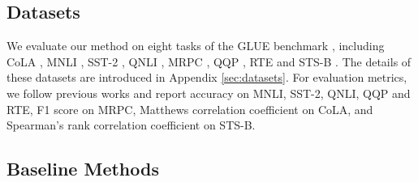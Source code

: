 \documentclass[11pt]{article}
\begin{document}
\subsection{Datasets}
We evaluate our method on eight tasks of the GLUE benchmark \citep{wang-etal-2018-glue}, including CoLA \citep{warstadt-etal-2019-neural}, MNLI \citep{williams-etal-2018-broad}, SST-2 \citep{socher-etal-2013-recursive}, QNLI \citep{rajpurkar-etal-2016-squad}, MRPC \citep{dolan-brockett-2005-automatically}, QQP \citep{chen2018quora}, RTE \citep{bentivogli2009fifth} and STS-B \citep{cer-etal-2017-semeval}. The details of these datasets are introduced in Appendix \ref{sec:datasets}. For evaluation metrics, we follow previous works \citep{park-etal-2021-distilling,liu-etal-2022-multi-granularity} and report accuracy on MNLI, SST-2, QNLI, QQP and RTE, F1 score on MRPC, Matthews correlation coefficient on CoLA, and Spearman’s rank correlation coefficient on STS-B.

\subsection{Baseline Methods}
\end{document}
